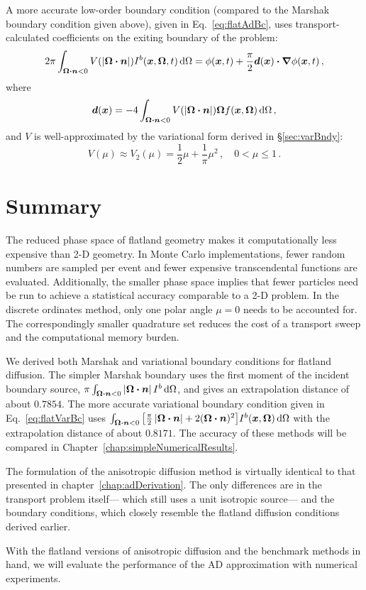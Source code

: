 A more accurate low-order boundary condition (compared to the Marshak
boundary condition given above), given in Eq.~\eqref{eq:flatAdBc}, uses
transport-calculated coefficients on the exiting boundary of the problem:
\begin{equation*}
2\pi \int_{\bm{\Omega}\bm{\cdot}\bm{n} < 0} V( \left| \bm{\Omega}\bm{\cdot}\bm{n} \right|)
I^b(\bm{x}, \bm{\Omega},t) \mathop{}\!\mathrm{d}\Omega
=
\phi(\bm{x},t)
+ \frac{\pi}{2} \bm{d}(\bm{x}) \bm{\cdot} \bm{\nabla} \phi(\bm{x},t)\,,
\end{equation*}
where
\begin{equation}\tagref{eq:flatAdBoundaryIntegral}
  \vec{d}(\vec{x}) = -4\int_{\vec{\Omega}\vd\vec{n} < 0}
  V(\abs{\vec{\Omega}\vd\vec{n}})
\vec{\Omega} f(\vec{x}, \vec{\Omega}) \ud\Omega\,,
\end{equation}
and $V$ is well-approximated by the variational form derived in
\S\ref{sec:varBndy}:
\begin{equation*}
  V(\mu) \approx V_2(\mu) =  \frac{1}{2} \mu + \frac{1}{\pi}\mu^2 \,,
  \quad 0 < \mu \le 1 \,.
\end{equation*}

\section{Summary}
The reduced phase space of flatland geometry makes it computationally less
expensive than 2-D geometry. In Monte Carlo
implementations, fewer random numbers are sampled per event and fewer expensive
transcendental functions are evaluated. Additionally, the smaller phase space
implies that fewer particles need be run to achieve a statistical
accuracy comparable to a 2-D problem. In the discrete ordinates method, only
one polar angle $\mu=0$
needs to be accounted for. The correspondingly smaller quadrature set reduces
the cost of a transport sweep and the computational memory burden.

We derived both Marshak and variational boundary conditions for flatland
diffusion. The simpler Marshak boundary uses
the first moment of the incident boundary source, $\pi
\int_{\bm{\Omega}\bm{\cdot} \bm{n} < 0 } \left| \bm{\Omega}\bm{\cdot} \bm{n} \right| I^b
\mathop{}\!\mathrm{d}\Omega$, and gives an extrapolation distance of about $0.7854$.
The more accurate variational boundary condition given in
Eq.~\eqref{eq:flatVarBc} uses $\int_{\bm{\Omega}\bm{\cdot}\bm{n} < 0}
\big[ \frac{\pi}{2} \left| \bm{\Omega}\bm{\cdot}\bm{n} \right| + 2 (\bm{\Omega}\bm{\cdot}\bm{n})^2
\big] I^b(\bm{x}, \bm{\Omega}) \mathop{}\!\mathrm{d}\Omega$ with the extrapolation
distance of about $0.8171$. The accuracy of these methods will be compared in
Chapter~\ref{chap:simpleNumericalResults}.

The formulation of the anisotropic diffusion method is virtually identical to
that presented in chapter~\ref{chap:adDerivation}. The only differences are in
the transport problem itself---%
which still uses a unit isotropic source---%
and the boundary conditions, which closely resemble the flatland diffusion
conditions derived earlier.

With the flatland versions of anisotropic diffusion and the benchmark methods in
hand, we will evaluate the performance of the AD approximation with numerical
experiments.

